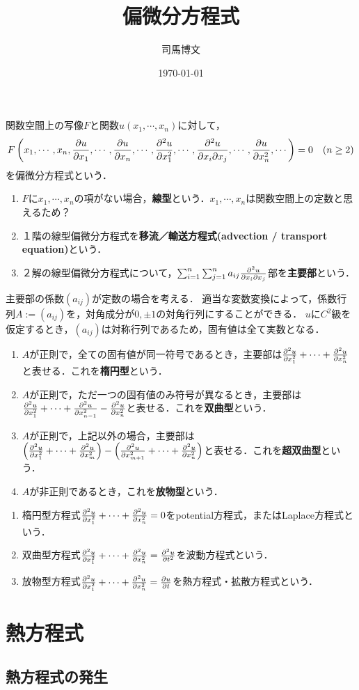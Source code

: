 \documentclass[uplatex,dvipdfmx]{jsreport}
\title{偏微分方程式}
\author{司馬博文}
\date{\today}
\begin{document}
\tableofcontents

関数空間上の写像$F$と関数$u(x_1,\cdots,x_n)$に対して，
\[F\left(x_1,\cdots,x_n,\frac{\partial u}{\partial x_1},\cdots,\frac{\partial u}{\partial x_n},\cdots,\frac{\partial ^2u}{\partial x_1^2},\cdots,\frac{\partial ^2u}{\partial x_i\partial x_j},\cdots,\frac{\partial u}{\partial x^2_n},\cdots\right)=0\quad(n\ge 2)\]
を偏微分方程式という．
\begin{enumerate}
    \item $F$に$x_1,\cdots,x_n$の項がない場合，\textbf{線型}という．$x_1,\cdots,x_n$は関数空間上の定数と思えるため？
    \item １階の線型偏微分方程式を\textbf{移流／輸送方程式(advection / transport equation)}という．
    \item ２解の線型偏微分方程式について，$\sum^n_{i=1}\sum^n_{j=1}a_{ij}\frac{\partial ^2u}{\partial x_i\partial x_j}$部を\textbf{主要部}という．
\end{enumerate}

主要部の係数$(a_{ij})$が定数の場合を考える．
適当な変数変換によって，係数行列$A:=(a_{ij})$を，対角成分が$0,\pm 1$の対角行列にすることができる．
$u$に$C^2$級を仮定するとき，$(a_{ij})$は対称行列であるため，固有値は全て実数となる．
\begin{enumerate}
    \item $A$が正則で，全ての固有値が同一符号であるとき，主要部は$\frac{\partial ^2u}{\partial x^2_1}+\cdots+\frac{\partial ^2u}{\partial x_n^2}$と表せる．これを\textbf{楕円型}という．
    \item $A$が正則で，ただ一つの固有値のみ符号が異なるとき，主要部は$\frac{\partial ^2u}{\partial x_1^2}+\cdots+\frac{\partial ^2u}{\partial x_{n-1}^2}-\frac{\partial ^2u}{\partial x^2_n}$と表せる．これを\textbf{双曲型}という．
    \item $A$が正則で，上記以外の場合，主要部は$\left(\frac{\partial ^2u}{\partial x_1^2}+\cdots+\frac{\partial ^2u}{\partial x^2_m}\right)-\left(\frac{\partial ^2u}{\partial x^2_{m+1}}+\cdots+\frac{\partial ^2u}{\partial x_n^2}\right)$と表せる．これを\textbf{超双曲型}という．
    \item $A$が非正則であるとき，これを\textbf{放物型}という．
\end{enumerate}

\begin{example}\mbox{}
    \begin{enumerate}
        \item 楕円型方程式$\frac{\partial ^2u}{\partial x_1^2}+\cdots+\frac{\partial ^2u}{\partial x^2_n}=0$をpotential方程式，またはLaplace方程式という．
        \item 双曲型方程式$\frac{\partial ^2u}{\partial x_1^2}+\cdots+\frac{\partial ^2u}{\partial x_n^2}=\frac{\partial ^2u}{\partial t^2}$を波動方程式という．
        \item 放物型方程式$\frac{\partial ^2u}{\partial x_1^2}+\cdots+\frac{\partial ^2u}{\partial x_n^2}=\frac{\partial u}{\partial t}$を熱方程式・拡散方程式という．
    \end{enumerate}
\end{example}

\chapter{熱方程式}

\section{熱方程式の発生}
\end{document}
